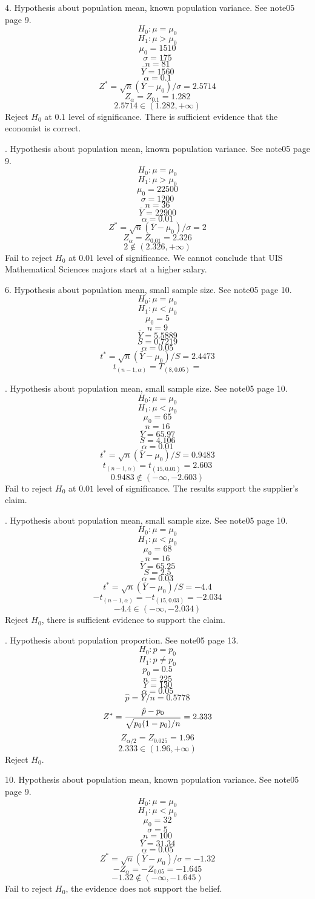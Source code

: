 \vfill
\eject

4. Hypothesis about population mean, known population variance.
See note05 page 9.
$$H_0: \mu=\mu_0$$
$$H_1: \mu>\mu_0$$
$$\mu_0=1510$$
$$\sigma=175$$
$$n=81$$
$$\bar Y=1560$$
$$\alpha=0.1$$
$$Z^*=\sqrt n(\bar Y-\mu_0)/\sigma=2.5714$$
$$Z_\alpha=Z_{0.1}=1.282$$
$$2.5714\in(1.282,+\infty)$$
Reject $H_0$ at $0.1$ level of significance.
There is sufficient evidence that the economist is correct.

. Hypothesis about population mean, known population variance.
See note05 page 9.
$$H_0: \mu=\mu_0$$
$$H_1: \mu>\mu_0$$
$$\mu_0=22500$$
$$\sigma=1200$$
$$n=36$$
$$\bar Y=22900$$
$$\alpha=0.01$$
$$Z^*=\sqrt n(\bar Y-\mu_0)/\sigma=2$$
$$Z_\alpha=Z_{0.01}=2.326$$
$$2\not\in(2.326,+\infty)$$
Fail to reject $H_0$ at $0.01$ level of significance.
We cannot conclude that UIS Mathematical Sciences
majors start at a higher salary.

\vfill
\eject

6. Hypothesis about population mean, small sample size.
See note05 page 10.
$$H_0:\mu=\mu_0$$
$$H_1:\mu<\mu_0$$
$$\mu_0=5$$
$$n=9$$
$$\bar Y=5.5889$$
$$S=0.7219$$
$$\alpha=0.05$$
$$t^*=\sqrt n(\bar Y-\mu_0)/S=2.4473$$
$$t_{(n-1,\alpha)}=T_{(8,0.05)}=$$

. Hypothesis about population mean, small sample size.
See note05 page 10.
$$H_0:\mu=\mu_0$$
$$H_1:\mu<\mu_0$$
$$\mu_0=65$$
$$n=16$$
$$\bar Y=65.97$$
$$S=4.106$$
$$\alpha=0.01$$
$$t^*=\sqrt n(\bar Y-\mu_0)/S=0.9483$$
$$t_{(n-1,\alpha)}=t_{(15,0.01)}=2.603$$
$$0.9483\not\in(-\infty,-2.603)$$
Fail to reject $H_0$ at $0.01$ level of significance.
The results support the supplier's claim.

\vfill
{}. Hypothesis about population mean, small sample size.
See note05 page 10.
$$H_0:\mu=\mu_0$$
$$H_1:\mu<\mu_0$$
$$\mu_0=68$$
$$n=16$$
$$\bar Y=65.25$$
$$S=2.5$$
$$\alpha=0.03$$
$$t^*=\sqrt n(\bar Y-\mu_0)/S=-4.4$$
$$-t_{(n-1,\alpha)}=-t_{(15,0.03)}=-2.034$$
$$-4.4\in(-\infty,-2.034)$$
Reject $H_0$, there is sufficient evidence to support the claim.

. Hypothesis about population proportion.
See note05 page 13.
$$H_0:p=p_0$$
$$H_1:p\ne p_0$$
$$p_0=0.5$$
$$n=225$$
$$Y=130$$
$$\alpha=0.05$$
$$\hat p=Y/n=0.5778$$
$$Z^*={\hat p - p_0\over\sqrt{p_0(1-p_0)/n}}=2.333$$
$$Z_{\alpha/2}=Z_{0.025}=1.96$$
$$2.333\in(1.96,+\infty)$$
Reject $H_0$.

\vfill
\eject

10. Hypothesis about population mean, known population variance.
See note05 page 9.
$$H_0:\mu=\mu_0$$
$$H_1:\mu<\mu_0$$
$$\mu_0=32$$
$$\sigma=5$$
$$n=100$$
$$\bar Y=31.34$$
$$\alpha=0.05$$
$$Z^*=\sqrt n(\bar Y-\mu_0)/\sigma=-1.32$$
$$-Z_\alpha=-Z_{0.05}=-1.645$$
$$-1.32\not\in(-\infty,-1.645)$$
Fail to reject $H_0$, the evidence does not support the belief.

